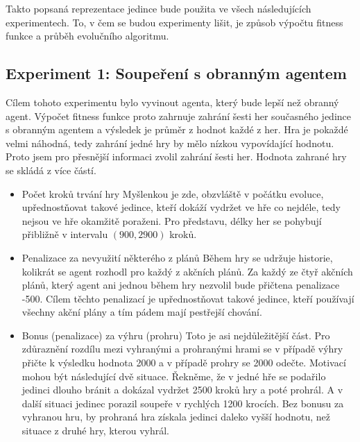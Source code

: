 Takto popsaná reprezentace jedince bude použita ve všech následujících experimentech. To, v čem se budou experimenty lišit, je způsob výpočtu fitness funkce a průběh evolučního algoritmu.

\newpage
\subsection{Experiment 1: Soupeření s obranným agentem}
Cílem tohoto experimentu bylo vyvinout agenta, který bude lepší než obranný agent.
Výpočet fitness funkce proto zahrnuje zahrání šesti her současného jedince s obranným agentem a výsledek je průměr z hodnot každé z her.
Hra je pokaždé velmi náhodná, tedy zahrání jedné hry by mělo nízkou vypovídající hodnotu. Proto jsem pro přesnější informaci zvolil zahrání šesti her.
Hodnota zahrané hry se skládá z více částí.
\begin{itemize}
    \item Počet kroků trvání hry
        \newline
        Myšlenkou je zde, obzvláště v počátku evoluce, upřednostňovat takové jedince, kteří dokáží vydržet ve hře co nejdéle, tedy nejsou ve hře okamžitě poraženi.
        Pro představu, délky her se pohybují přibližně v intervalu $(900, 2900)$ kroků.
    \item Penalizace za nevyužití některého z plánů
        \newline
        Během hry se udržuje historie, kolikrát se agent rozhodl pro každý z akčních plánů.
        Za každý ze čtyř akčních plánů, který agent ani jednou během hry nezvolil bude přičtena penalizace -500. Cílem těchto penalizací je upřednostňovat takové jedince, kteří používají všechny akční plány a tím pádem mají pestřejší chování. 
    \item Bonus (penalizace) za výhru (prohru)
        \newline
        Toto je asi nejdůležitější část. Pro zdůraznění rozdílu mezi vyhranými a prohranými hrami se v případě výhry přičte k výsledku hodnota 2000 a v případě prohry se 2000 odečte.
        Motivací mohou být následující dvě situace. Řekněme, že v jedné hře se podařilo jedinci dlouho bránit a dokázal vydržet 2500 kroků hry a poté prohrál. A v další situaci jedinec porazil soupeře v rychlých 1200 krocích. 
        Bez bonusu za vyhranou hru, by prohraná hra získala jedinci daleko vyšší hodnotu, než situace z druhé hry, kterou vyhrál.        
    
\end{itemize}

